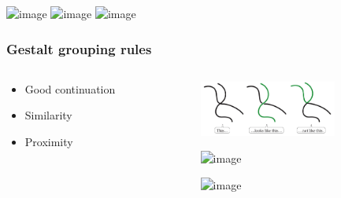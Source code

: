 \documentclass[]{beamer}
\begin{document}
\begin{frame}
\begin{overlayarea}{120mm}{40mm}
\begin{center}
\includegraphics<1>[width=60mm]{../../../figures/bregman_Bs.png}
\includegraphics<2>[width=20mm]{../../../figures/banana_penetrates_brick.png}
\includegraphics<3->[width=60mm]{../../../figures/amodal_michotte.png}
\end{center}
\end{overlayarea}
\end{frame}



\begin{frame}
\frametitle{Gestalt grouping rules}
\begin{overlayarea}{110mm}{70mm}
\begin{columns}[T]
\begin{column}{50mm}
\begin{center}
 \begin{itemize}
\setlength{\itemsep}{50pt}
 \item Good continuation
 \item<2-> Similarity
 \item<3-> Proximity
\end{itemize}
\end{center}
\end{column}

 \begin{column}{50mm}
\begin{center}
\includegraphics[width=45mm]{figs/l5/good_continuation.png}

\vspace{3mm}
\includegraphics<2->[width=15mm]{figs/l5/gestalt_similarity.png}

\vspace{8mm}
\includegraphics<3->[width=15mm]{figs/l5/gestalt_proximity.png}
\end{center}
 \end{column}
\end{columns}
\end{overlayarea}
\end{frame}
\end{document}
